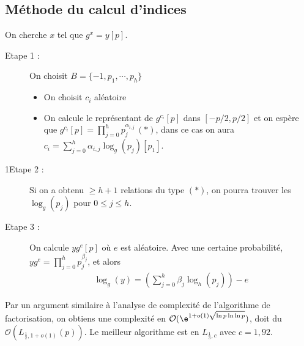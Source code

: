         \subsection{Méthode du calcul d'indices}
            On cherche $x$ tel que $g^x = y[p]$.
            \begin{description}
                \item[Etape 1 :] On choisit $B = \{-1, p_1, \cdots, p_h\}$
                \begin{itemize}
                    \item On choisit $c_i$ aléatoire
                    \item On calcule le représentant de $g^{c_i}[p]$ dans $[-p/2, p/2]$ et on espère que $g^{c_i}[p] = \prod_{j = 0}^h p_j^{\alpha_{i,j}} \, (*)$, dans ce cas on aura $c_i = \sum_{j = 0}^h \alpha_{i,j} \log_g(p_j) [p_1]$.
                \end{itemize} 
                \item[1Etape 2 :] Si on a obtenu $\geq h + 1$ relations du type $(*)$, on pourra trouver les $\log_g(p_j)$ pour $0 \leq j \leq h$.
                \item[Etape 3 :] On calcule $yg^e [p]$ où $e$ est aléatoire. Avec une certaine probabilité, $yg^e = \prod_{j = 0}^h p_j^{\beta_j}$, et alors
                \begin{align*}
                    \log_g(y) = \left(\sum_{j = 0}^h \beta_j \log_h(p_j)\right) - e
                \end{align*}
            \end{description}
            Par un argument similaire à l'analyse de complexité de l'algorithme de factorisation, on obtiens une complexité en $\mathcal{O}(\e^{1 + o(1) \sqrt{\ln p \ln \ln p}})$, doit du $\mathcal{O}(L_{\frac12, 1 + o(1)}(p))$. Le meilleur algorithme est en $L_{\frac13, c}$ avec $c = 1,92$. 